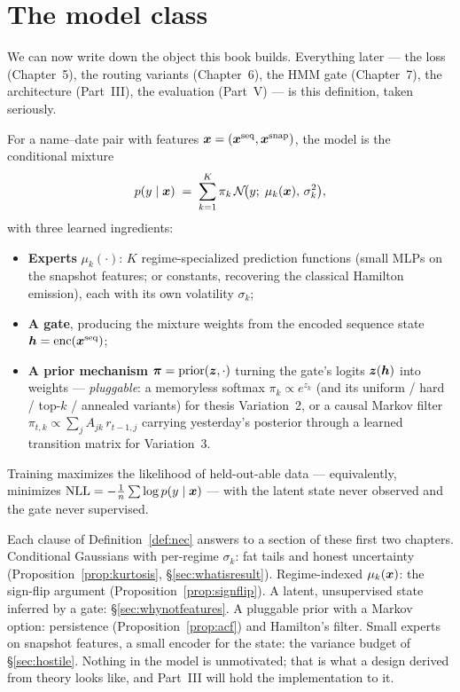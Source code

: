 \section{The model class}\label{sec:modelclass}

We can now write down the object this book builds. Everything later --- the
loss (Chapter~5), the routing variants (Chapter~6), the HMM gate
(Chapter~7), the architecture (Part~III), the evaluation (Part~V) --- is
this definition, taken seriously.

\begin{definition}\label{def:nec}
For a name--date pair with features
$\bm{x} = (\bm{x}^{\text{seq}}, \bm{x}^{\text{snap}})$, the model is the conditional
mixture
\[
  p(y \mid \bm{x})
  \;=\; \sum_{k=1}^{K} \pi_k \,\mathcal{N}\!\bigl(y;\; \mu_k(\bm{x}),\, \sigma_k^2\bigr),
\]
with three learned ingredients:
\begin{itemize}[leftmargin=2em]
\item \textbf{Experts} $\mu_k(\cdot)$: $K$ regime-specialized prediction
  functions (small MLPs on the snapshot features; or constants, recovering
  the classical Hamilton emission), each with its own volatility
  $\sigma_k$;
\item \textbf{A gate}, producing the mixture weights from the encoded
  sequence state $\bm{h} = \mathrm{enc}(\bm{x}^{\text{seq}})$;
\item \textbf{A prior mechanism} $\bm{\pi} = \mathrm{prior}(\bm{z}, \cdot)$
  turning the gate's logits $\bm{z}(\bm{h})$ into weights --- \emph{pluggable}:
  a memoryless softmax $\pi_k \propto e^{z_k}$ (and its uniform / hard /
  top-$k$ / annealed variants) for thesis Variation~2, or a causal Markov
  filter $\pi_{t,k} \propto \sum_j A_{jk}\, r_{t-1,j}$ carrying yesterday's
  posterior through a learned transition matrix for Variation~3.
\end{itemize}
Training maximizes the likelihood of held-out-able data --- equivalently,
minimizes $\mathrm{NLL} = -\frac1n\sum \log p(y \mid \bm{x})$ --- with the latent state
never observed and the gate never supervised.
\end{definition}

Each clause of Definition~\ref{def:nec} answers to a section of these first
two chapters. Conditional Gaussians with per-regime $\sigma_k$: fat tails
and honest uncertainty (Proposition~\ref{prop:kurtosis},
\S\ref{sec:whatisresult}). Regime-indexed $\mu_k(\bm{x})$: the sign-flip
argument (Proposition~\ref{prop:signflip}). A latent, unsupervised state
inferred by a gate: \S\ref{sec:whynotfeatures}. A pluggable prior with a
Markov option: persistence (Proposition~\ref{prop:acf}) and Hamilton's
filter. Small experts on snapshot features, a small encoder for the state:
the variance budget of \S\ref{sec:hostile}. Nothing in the model is
unmotivated; that is what a design derived from theory looks like, and
Part~III will hold the implementation to it.

